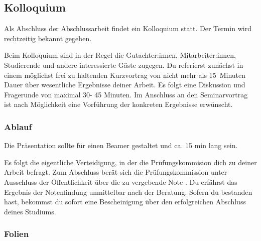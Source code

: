 \subsection{Kolloquium}
\label{sec:kolloquium}

Als Abschluss der Abschlussarbeit findet ein Kolloquium statt. Der Termin wird rechtzeitig bekannt gegeben. 

Beim Kolloquium sind in der Regel die Gutachter:innen, Mitarbeiter:innen, Studierende  und andere interessierte Gäste zugegen. Du referierst zunächst in einem möglichst frei zu haltenden Kurzvortrag von nicht mehr als 15~Minuten Dauer über wesentliche Ergebnisse deiner Arbeit. Es folgt eine Diskussion und Fragerunde von maximal 30- 45 Minuten. Im Anschluss an den Seminarvortrag ist nach Möglichkeit eine Vorführung der konkreten Ergebnisse erwünscht.


\subsubsection{Ablauf}

 Die Präsentation sollte für einen Beamer gestaltet und ca. 15 min lang sein.
 
Es folgt die eigentliche Verteidigung, in der die Prüfungskommision dich zu deiner Arbeit befragt. Zum Abschluss berät sich die Prüfungskommission  unter Ausschluss der Öffentlichkeit über die zu vergebende Note . Du erfährst das Ergebnis der Notenfindung unmittelbar nach der Beratung. Sofern du bestanden hast, bekommst du sofort eine Bescheinigung über den erfolgreichen Abschluss deines Studiums. 

\subsubsection{Folien}

